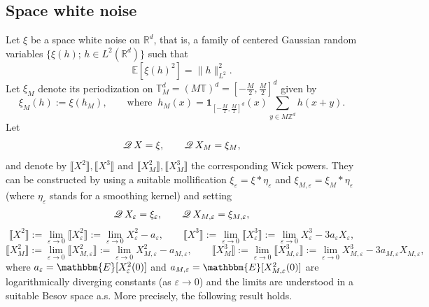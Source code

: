\documentclass[a4paper,11pt]{article}
\newcommand{\assign}{:=}
\numberwithin{equation}{section}
\newcommand{\Q}{\mathscr{Q} \hspace{.2em}}
\newcommand{\R}{\mathbb{R}}
\newcommand{\8}{\infty}
\begin{document}
\subsection{Space white noise}
\label{ssec:renorm-el}

Let $\xi$ be a space white noise on $\R^{d}$, that is, a family of centered Gaussian random variables $\{\xi(h);\,h\in L^{2}(\R^{d}) \}$ such that
$$
\mathbb{E}[\xi(h)^{2}]=\|h\|^{2}_{L^{2}}.
$$
Let $\xi_{M}$ denote its periodization on $\mathbb{T}^{d}_{M}=(M\mathbb{T})^{d}=\left[-\frac{M}{2},\frac{M}{2}\right]^{d}$ given by
$$
\xi_{M}(h):=\xi(h_{M}),\qquad\text{where }\ h_{M}(x)=\mathbf{1}_{[-\frac{M}{2},\frac{M}{2}]^{d}}(x)\sum_{y\in M\mathbb{Z}^{d}}h(x+y).
$$
Let 
\begin{equation*}
 \Q X = \xi, \qquad  \Q X_{M} = \xi_{M},
\end{equation*}
and denote by $  \llbracket X^2 \rrbracket, \llbracket X^3 \rrbracket $ and $  \llbracket X_{M}^2 \rrbracket, \llbracket X_{M}^3 \rrbracket $ the corresponding Wick powers. They can be constructed by using a suitable mollification $\xi_{\varepsilon}=\xi*\eta_{\varepsilon}$ and $\xi_{M,\varepsilon}=\xi_{M}*\eta_{\varepsilon}$ (where $\eta_{\varepsilon}$ stands for a smoothing kernel) and setting
$$
 \Q X_{\varepsilon} = \xi_{\varepsilon}, \qquad  \Q X_{M,\varepsilon} = \xi_{M,\varepsilon},
$$
$$
 \llbracket X^2 \rrbracket  \assign \lim_{\varepsilon\to 0}  \llbracket X_{\varepsilon}^2 \rrbracket  \assign \lim_{\varepsilon\to 0}  X_{\varepsilon}^2 - a_{\varepsilon}, \qquad   \llbracket X^3 \rrbracket\assign\lim_{\varepsilon\to 0}  \llbracket X_{\varepsilon}^3 \rrbracket\assign \lim_{\varepsilon\to 0} X_{\varepsilon}^3 - 3 a_{\varepsilon} X_{\varepsilon},
 $$
 $$
 \llbracket X_{M}^2 \rrbracket  \assign \lim_{\varepsilon\to 0}  \llbracket X_{M,\varepsilon}^2 \rrbracket  \assign \lim_{\varepsilon\to 0}  X_{M,\varepsilon}^2 - a_{M,\varepsilon}, \qquad   \llbracket X_{M}^3 \rrbracket\assign\lim_{\varepsilon\to 0} \llbracket X_{M,\varepsilon}^3 \rrbracket\assign\lim_{\varepsilon\to 0} X_{M,\varepsilon}^3 - 3 a_{M,\varepsilon} X_{M,\varepsilon},
 $$
 where $a_{\varepsilon}= \mathbbm{E}[X_{\varepsilon}^2(0)]$  and $a_{M,\varepsilon}= \mathbbm{E}[X_{M,\varepsilon}^2(0)]$ are logarithmically diverging constants (as $\varepsilon\to0$) and the limits are understood in a suitable Besov space a.s. More precisely, the following result holds.
 
\end{document}
